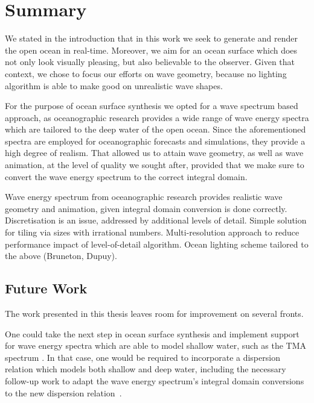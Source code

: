 \chapter{Summary}
\label{ch:summary}

We stated in the introduction that in this work we seek to generate and render the
open ocean in real-time. Moreover, we aim for an ocean surface which does not only
look visually pleasing, but also believable to the observer. Given that context,
we chose to focus our efforts on wave geometry, because no lighting algorithm
is able to make good on unrealistic wave shapes.

For the purpose of ocean surface synthesis we opted for a wave spectrum
based approach, as oceanographic research provides a wide range of wave
energy spectra which are tailored to the deep water of the open ocean.
Since the aforementioned spectra are employed for oceanographic forecasts
and simulations, they provide a high degree of realism. That allowed us to
attain wave geometry, as well as wave animation, at the level of quality
we sought after, provided that we make sure to convert the wave energy
spectrum to the correct integral domain.


Wave energy spectrum from oceanographic research provides realistic wave geometry
and animation, given integral domain conversion is done correctly.
Discretisation is an issue, addressed by additional levels of detail.
Simple solution for tiling via sizes with irrational numbers.
Multi-resolution approach to reduce performance impact of level-of-detail
algorithm.
Ocean lighting scheme tailored to the above (Bruneton, Dupuy).

\section{Future Work}
The work presented in this thesis leaves room for improvement on several fronts.

One could take the next step in ocean surface synthesis and implement support
for wave energy spectra which are able to model shallow water, such as the
TMA spectrum \citep{Hughes:1984}. In that case, one would be required to
incorporate a dispersion relation which models both shallow and deep water,
including the necessary follow-up work to adapt the wave energy spectrum's
integral domain conversions to the new dispersion relation~\citep{Horvath:2015}.

